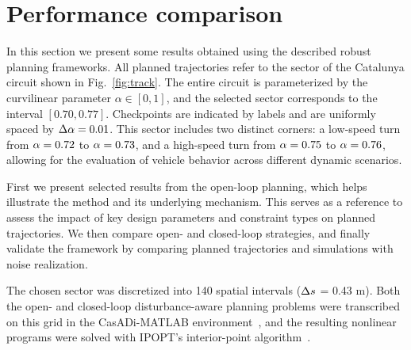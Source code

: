 \section{Performance comparison}
\label{sec:performance_comparison}

In this section we present some results obtained using the described robust planning frameworks. All planned trajectories refer to the sector of the Catalunya circuit shown in Fig.~\ref{fig:track}.
The entire circuit is parameterized by the curvilinear parameter $\alpha \in [0,1]$, and the selected sector corresponds to the interval $\left[0.70, 0.77\right]$. Checkpoints are indicated by labels and are uniformly spaced by $\Delta\alpha=0.01$. This sector includes two distinct corners: a low-speed turn from $\alpha = 0.72$ to $\alpha = 0.73$, and a high-speed turn from $\alpha = 0.75$ to $\alpha = 0.76$, allowing for the evaluation of vehicle behavior across different dynamic scenarios.

First we present selected results from the open-loop planning, which helps illustrate the method and its underlying mechanism.
This serves as a reference to assess the impact of key design parameters and constraint types on planned trajectories.
We then compare open- and closed-loop strategies, and finally validate the framework by comparing planned trajectories and simulations with noise realization.

The chosen sector was discretized into 140 spatial intervals ($\Delta s$ = 0.43 m). Both the open- and closed-loop disturbance-aware planning problems were transcribed on this grid in the CasADi-MATLAB environment~\cite{Andersson:MPC:2019}, and the resulting nonlinear programs were solved with IPOPT's interior-point algorithm~\cite{Wachter:MP:2006}.



